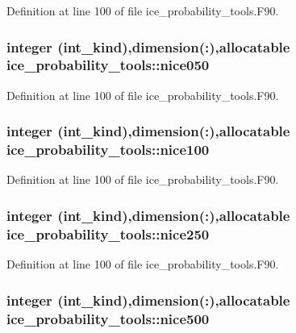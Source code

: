 Definition at line 100 of file ice\_\-probability\_\-tools.F90.\hypertarget{namespaceice__probability__tools_a9263f16b9cec2512c8b0c9d1b07fbd2d}{
\subsubsection[{nice050}]{\setlength{\rightskip}{0pt plus 5cm}integer (int\_\-kind),dimension(:),allocatable {\bf ice\_\-probability\_\-tools::nice050}}}
\label{namespaceice__probability__tools_a9263f16b9cec2512c8b0c9d1b07fbd2d}


Definition at line 100 of file ice\_\-probability\_\-tools.F90.\hypertarget{namespaceice__probability__tools_aea9a275f5ab127afd6106f0377adb741}{
\subsubsection[{nice100}]{\setlength{\rightskip}{0pt plus 5cm}integer (int\_\-kind),dimension(:),allocatable {\bf ice\_\-probability\_\-tools::nice100}}}
\label{namespaceice__probability__tools_aea9a275f5ab127afd6106f0377adb741}


Definition at line 100 of file ice\_\-probability\_\-tools.F90.\hypertarget{namespaceice__probability__tools_a28e6a34d3f9ec9f1edc6985ba263b41a}{
\subsubsection[{nice250}]{\setlength{\rightskip}{0pt plus 5cm}integer (int\_\-kind),dimension(:),allocatable {\bf ice\_\-probability\_\-tools::nice250}}}
\label{namespaceice__probability__tools_a28e6a34d3f9ec9f1edc6985ba263b41a}


Definition at line 100 of file ice\_\-probability\_\-tools.F90.\hypertarget{namespaceice__probability__tools_ad3ea4a7f9fd8145949defb7e6ece246d}{
\subsubsection[{nice500}]{\setlength{\rightskip}{0pt plus 5cm}integer (int\_\-kind),dimension(:),allocatable {\bf ice\_\-probability\_\-tools::nice500}}}
\label{namespaceice__probability__tools_ad3ea4a7f9fd8145949defb7e6ece246d}


